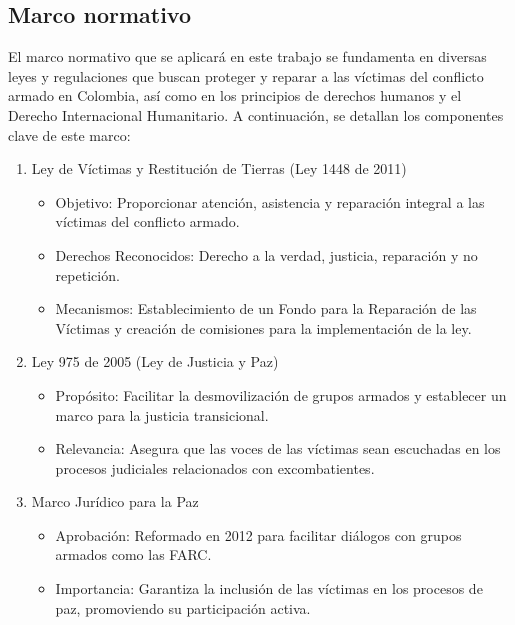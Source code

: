 \documentclass[letterpaper, 12pt]{article}
\begin{document}
\subsection*{Marco normativo}

El marco normativo que se aplicará en este trabajo se fundamenta en diversas
leyes y regulaciones que buscan proteger y reparar a las víctimas del conflicto
armado en Colombia, así como en los principios de derechos humanos y el Derecho
Internacional Humanitario. A continuación, se detallan los componentes clave de
este marco:

\begin{enumerate}
      \item Ley de Víctimas y Restitución de Tierras (Ley 1448 de 2011)
            \begin{itemize}[label=$\bullet$]
                  \item Objetivo: Proporcionar atención, asistencia y reparación integral a las
                        víctimas del conflicto armado.
                  \item Derechos Reconocidos: Derecho a la verdad, justicia, reparación y no
                        repetición.
                  \item Mecanismos: Establecimiento de un Fondo para la Reparación de las Víctimas y
                        creación de comisiones para la implementación de la ley.

            \end{itemize}

      \item Ley 975 de 2005 (Ley de Justicia y Paz)
            \begin{itemize}
                  \item Propósito: Facilitar la desmovilización de grupos armados y establecer un marco
                        para la justicia transicional.
                  \item Relevancia: Asegura que las voces de las víctimas sean escuchadas en los
                        procesos judiciales relacionados con excombatientes.

            \end{itemize}

      \item Marco Jurídico para la Paz
            \begin{itemize}
                  \item Aprobación: Reformado en 2012 para facilitar diálogos con grupos armados como
                        las FARC\@{}.
                  \item Importancia: Garantiza la inclusión de las víctimas en los procesos de paz,
                        promoviendo su participación activa.
            \end{itemize}


\end{enumerate}
\end{document}
